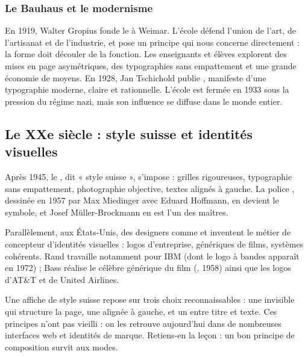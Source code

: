 \subsubsection{Le Bauhaus et le modernisme}

En 1919, Walter Gropius fonde le  à Weimar. L'école défend l'union de l'art, de l'artisanat et de l'industrie, et pose un principe qui nous concerne directement : la forme doit découler de la fonction. Les enseignants et élèves explorent des mises en page asymétriques, des typographies sans empattement et une grande économie de moyens. En 1928, Jan Tschichold publie , manifeste d'une typographie moderne, claire et rationnelle. L'école est fermée en 1933 sous la pression du régime nazi, mais son influence se diffuse dans le monde entier.

\subsection{Le XXe siècle : style suisse et identités visuelles}

Après 1945, le , dit « style suisse », s'impose : grilles rigoureuses, typographie sans empattement, photographie objective, textes alignés à gauche. La police , dessinée en 1957 par Max Miedinger avec Eduard Hoffmann, en devient le symbole, et Josef Müller-Brockmann en est l'un des maîtres.

Parallèlement, aux États-Unis, des designers comme  et  inventent le métier de concepteur d'identités visuelles : logos d'entreprise, génériques de films, systèmes cohérents. Rand travaille notamment pour IBM (dont le logo à bandes apparaît en 1972) ; Bass réalise le célèbre générique du film  (, 1958) ainsi que les logos d'AT\&T et de United Airlines.

\begin{defbox}
Une affiche de style suisse repose sur trois choix reconnaissables : une  invisible qui structure la page, une  alignée à gauche, et un  entre titre et texte. Ces principes n'ont pas vieilli : on les retrouve aujourd'hui dans de nombreuses interfaces web et identités de marque. Retiens-en la leçon : un bon principe de composition survit aux modes.
\end{defbox}

